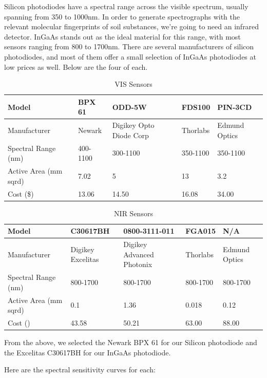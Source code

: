	Silicon photodiodes have a spectral range across the visible spectrum, usually spanning from 350 to 1000nm. In order to generate spectrographs with the relevant molecular fingerprints of soil substances, we're going to need an infrared detector. InGaAs stands out as the ideal material for this range, with most sensors ranging from 800 to 1700nm. There are several manufacturers of silicon photodiodes, and most of them offer a small selection of InGaAs photodiodes at low prices as well. Below are the four of each.


\begin{table}[H]
	\centering
	\label{table:VISsensors}
	\caption{VIS Sensors}
	\begin{tabular}{|p{2cm}|l|l|l|l|}
	\hline    
	Model & BPX 61 & ODD-5W & FDS100 & PIN-3CD\\
    \hline
	Manufacturer & Newark & Digikey Opto Diode Corp & Thorlabs & Edmund Optics\\
    \hline
	Spectral Range (nm) & 400-1100 & 300-1100 & 350-1100 & 350-1100\\
    \hline
	Active Area (mm sqrd) & 7.02 & 5 & 13 & 3.2\\
    \hline
	Cost (\$) & 13.06 & 14.50 & 16.08 & 34.00\\
    \hline
	\end{tabular}
\end{table}



\begin{table}[H]
	\centering
	\label{table:NIRsensors}
	\caption{NIR Sensors}
	\begin{tabular}{|p{2cm}|l|l|l|l|}
	\hline    
	Model & C30617BH & 0800-3111-011 & FGA015 & N/A\\
	\hline
	Manufacturer & Digikey Excelitas & Digikey Advanced Photonix & Thorlabs & Edmund Optics\\
	\hline
	Spectral Range (nm) & 800-1700 & 800-1700 & 800-1700 & 800-1700\\
	\hline
	Active Area (mm sqrd) & 0.1 & 1.36 & 0.018 & 0.12\\
	\hline
	Cost (\textdollar) & 43.58 & 50.21 & 63.00 & 88.00 \\
	\hline
	\end{tabular}
\end{table}


From the above, we selected the Newark BPX 61 for our Silicon photodiode and the Excelitas C30617BH for our InGaAs photodiode.

Here are the spectral sensitivity curves for each:

